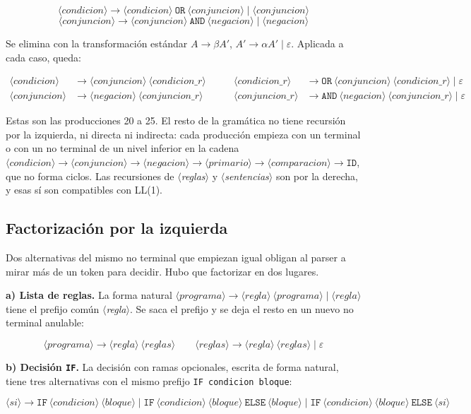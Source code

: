 \documentclass[10pt,a4paper]{article}
\newcommand{\nt}[1]{\ensuremath{\langle}\textit{#1}\ensuremath{\rangle}}   %
\newcommand{\tm}[1]{\texttt{#1}}                                          %
\begin{document}
\[\nt{condicion} \rightarrow \nt{condicion}\ \tm{OR}\ \nt{conjuncion} \mid \nt{conjuncion}\]
\[\nt{conjuncion} \rightarrow \nt{conjuncion}\ \tm{AND}\ \nt{negacion} \mid \nt{negacion}\]

Se elimina con la transformación estándar $A \rightarrow \beta A'$, $A' \rightarrow \alpha A' \mid \varepsilon$.
Aplicada a cada caso, queda:

\[
\begin{aligned}
\nt{condicion} &\rightarrow \nt{conjuncion}\ \nt{condicion\_r} &\qquad
\nt{condicion\_r} &\rightarrow \tm{OR}\ \nt{conjuncion}\ \nt{condicion\_r} \mid \varepsilon\\
\nt{conjuncion} &\rightarrow \nt{negacion}\ \nt{conjuncion\_r} &\qquad
\nt{conjuncion\_r} &\rightarrow \tm{AND}\ \nt{negacion}\ \nt{conjuncion\_r} \mid \varepsilon
\end{aligned}
\]

Estas son las producciones 20 a 25. El resto de la gramática no tiene recursión por la izquierda,
ni directa ni indirecta: cada producción empieza con un terminal o con un no terminal de un nivel
inferior en la cadena
$\nt{condicion} \to \nt{conjuncion} \to \nt{negacion} \to \nt{primario} \to \nt{comparacion} \to \tm{ID}$,
que no forma ciclos. Las recursiones de \nt{reglas} y \nt{sentencias} son por la derecha, y esas sí
son compatibles con LL(1).

\subsection{Factorización por la izquierda}
\label{sec:factorizacion}

Dos alternativas del mismo no terminal que empiezan igual obligan al parser a mirar más de un token
para decidir. Hubo que factorizar en dos lugares.

\textbf{a) Lista de reglas.} La forma natural
$\nt{programa} \rightarrow \nt{regla}\ \nt{programa} \mid \nt{regla}$ tiene el prefijo común \nt{regla}.
Se saca el prefijo y se deja el resto en un nuevo no terminal anulable:

\[
\nt{programa} \rightarrow \nt{regla}\ \nt{reglas}
\qquad
\nt{reglas} \rightarrow \nt{regla}\ \nt{reglas} \mid \varepsilon
\]

\textbf{b) Decisión \tm{IF}.} La decisión con ramas opcionales, escrita de forma natural, tiene tres
alternativas con el mismo prefijo \tm{IF condicion bloque}:

\[
\nt{si} \rightarrow \tm{IF}\ \nt{condicion}\ \nt{bloque}
\mid \tm{IF}\ \nt{condicion}\ \nt{bloque}\ \tm{ELSE}\ \nt{bloque}
\mid \tm{IF}\ \nt{condicion}\ \nt{bloque}\ \tm{ELSE}\ \nt{si}
\]
\end{document}
